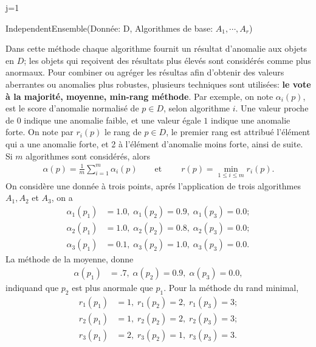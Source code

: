 \begin{algorithm}
\SetAlgoLined
j=1\;
\caption{IndependentEnsemble(Donnée: D,
	Algorithmes de base: $A_1,\cdots,A_r$)}
\end{algorithm}
Dans cette  méthode chaque algorithme fournit un résultat  d'anomalie
aux objets en $D$; les objets qui reçoivent des résultats plus élevés sont considérés comme plus anormaux. Pour combiner ou agréger les résultas afin d'obtenir des valeurs aberrantes ou anomalies plus robustes, plusieurs techniques sont utilisées: \textbf{le vote à la majorité, moyenne, min-rang méthode}. Par exemple, 
on note $\alpha_i(p)$, est le score d'anomalie normalisé de $p\in D$, selon
algorithme $i$. Une valeur proche de $0$  indique une anomalie faible, et une valeur égale $1$ indique une anomalie forte. On note par $r_i(p)$ le rang de $p\in D$, le premier rang est attribué l'élément qui a une anomalie forte,  et 2 à l'élément d'anomalie moins  forte, ainsi de suite. Si $m$ algorithmes sont considérés, alors
\begin{align}
\alpha(p)=\frac{1}{m}\sum_{i=1}^{m}\alpha_i(p) \qquad \text{et}\; \qquad r(p) =\min_{1\leq i \leq m} r_i(p).
\end{align}
 On considère une donnée à trois points, aprés l'application de trois
algorithmes $A_1, A_2$ et $A_3$, on a 
\begin{align*}
	\alpha_{1}\left(p_{1}\right)&=1.0,\; \alpha_{1}\left(p_{2}\right)=0.9,\; \alpha_{1}\left(p_{3}\right)=0.0; \\ 
\alpha_{2}\left(p_{1}\right)&=1.0,\; \alpha_{2}\left(p_{2}\right)=0.8,\; \alpha_{2}\left(p_{3}\right)=0.0;\\
\alpha_{3}\left(p_{1}\right)&=0.1,\;  \alpha_{3}\left(p_{2}\right)=1.0,\; \alpha_{3}\left(p_{3}\right)=0.0.
\end{align*}
La méthode de la moyenne, donne 
\begin{align*}
\alpha\left(p_{1}\right)&=.7,\; \alpha\left(p_{2}\right)=0.9,\; \alpha\left(p_{3}\right)=0.0,
\end{align*}
indiquand que $p_2$ est plus anormale que $p_1$. Pour la méthode du rand minimal,
\begin{align*}
r_{1}\left(p_{1}\right)&=1,\; r_{1}\left(p_{2}\right)=2,\; r_{1}\left(p_{3}\right)=3;\\ 
r_{2}\left(p_{1}\right)&=1,\; r_{2}\left(p_{2}\right)=2,\; r_{2}\left(p_{3}\right)=3;\\
r_{3}\left(p_{1}\right)&=2,\; r_{3}\left(p_{2}\right)=1,\; r_{3}\left(p_{3}\right)=3.
\end{align*}
